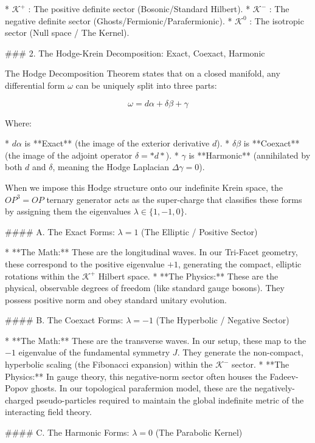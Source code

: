 * $\mathcal{K}^+$ : The positive definite sector (Bosonic/Standard Hilbert).
* $\mathcal{K}^-$ : The negative definite sector (Ghosts/Fermionic/Parafermionic).
* $\mathcal{K}^0$ : The isotropic sector (Null space / The Kernel).

### 2. The Hodge-Krein Decomposition: Exact, Coexact, Harmonic

The Hodge Decomposition Theorem states that on a closed manifold, any differential form $\omega$ can be uniquely split into three parts:


$$\omega = d\alpha + \delta\beta + \gamma$$


Where:

* $d\alpha$ is **Exact** (the image of the exterior derivative $d$).
* $\delta\beta$ is **Coexact** (the image of the adjoint operator $\delta = *d*$).
* $\gamma$ is **Harmonic** (annihilated by both $d$ and $\delta$, meaning the Hodge Laplacian $\Delta\gamma = 0$).

When we impose this Hodge structure onto our indefinite Krein space, the $OP^3=OP$ ternary generator acts as the super-charge that classifies these forms by assigning them the eigenvalues $\lambda \in \{1, -1, 0\}$.

#### A. The Exact Forms: $\lambda = 1$ (The Elliptic / Positive Sector)

* **The Math:** These are the longitudinal waves. In our Tri-Facet geometry, these correspond to the positive eigenvalue $+1$, generating the compact, elliptic rotations within the $\mathcal{K}^+$ Hilbert space.
* **The Physics:** These are the physical, observable degrees of freedom (like standard gauge bosons). They possess positive norm and obey standard unitary evolution.

#### B. The Coexact Forms: $\lambda = -1$ (The Hyperbolic / Negative Sector)

* **The Math:** These are the transverse waves. In our setup, these map to the $-1$ eigenvalue of the fundamental symmetry $J$. They generate the non-compact, hyperbolic scaling (the Fibonacci expansion) within the $\mathcal{K}^-$ sector.
* **The Physics:** In gauge theory, this negative-norm sector often houses the Fadeev-Popov ghosts. In our topological parafermion model, these are the negatively-charged pseudo-particles required to maintain the global indefinite metric of the interacting field theory.

#### C. The Harmonic Forms: $\lambda = 0$ (The Parabolic Kernel)

